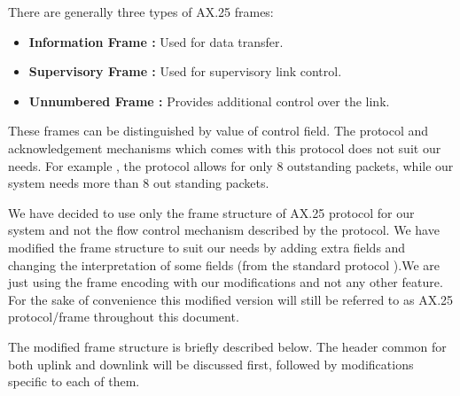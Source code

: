 \documentclass[BTech]{iitmdiss}
\begin{document}
\par There are generally three types of AX.25 frames:
\begin{itemize}
\item  \textbf{Information Frame : }Used for data transfer.
\item \textbf{Supervisory Frame : }Used for supervisory link control.
\item \textbf{Unnumbered Frame : } Provides additional control over the link.
\end{itemize}
These frames can be distinguished by value of control field. The protocol and acknowledgement mechanisms which comes with this protocol does not suit our needs. For example , the protocol allows for only 8 outstanding packets, while our system needs more than 8 out standing packets.

\par We have decided to use only the frame structure of AX.25 protocol for our system and not the flow control mechanism described by the protocol. We have modified the frame structure to suit our needs by adding extra fields and changing the interpretation of some fields (from the standard protocol ).We are just using the frame encoding with our modifications and not any other feature. For the sake of convenience this modified version will still be referred to as AX.25 protocol/frame throughout this document. 
\par  The modified frame structure is briefly described below. The header common for both uplink and downlink will be discussed first, followed by modifications specific to each of them.
\end{document}
